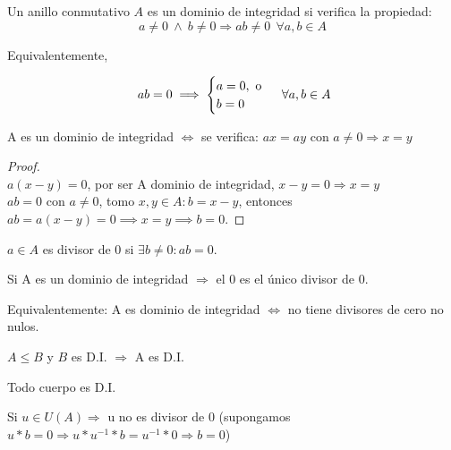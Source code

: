 \begin{ndef}
Un anillo conmutativo $A$ es un dominio de integridad si verifica la propiedad:
\[
a \neq 0\ \wedge\ b \neq 0 \Rightarrow ab \neq 0 \ \ \forall a,b \in A
\]

Equivalentemente,

\[ \hspace{0.1cm} ab=0 \implies \begin{cases}
	a = 0,\text{ o}\\
	b = 0
\end{cases} \ \forall a,b \in A
\]

\end{ndef}

\begin{nprop}

A es un dominio de integridad $\iff$ se verifica: $ax=ay$ con $a\neq 0 \Rightarrow x = y$
\end{nprop}
\begin{proof}\hfill\\
	\boxed{\Rightarrow} $a(x-y) = 0$, por ser A dominio de integridad, $x-y = 0 \Rightarrow x=y$ \\
	\boxed{\Leftarrow} $ab = 0$ con $a\neq 0$, tomo $x,y \in A : b = x-y$, entonces $ab = a(x-y) = 0 \implies x=y \implies b = 0$.
\end{proof}

\begin{ndef}[Divisor de 0]
	$a\in A$ es divisor de 0 si $\exists b\neq 0 : ab = 0$.
\end{ndef}

\begin{nprop}
	Si A es un dominio de integridad $\Rightarrow$ el 0 es el único divisor de 0.

	Equivalentemente: A es dominio de integridad $\iff$ no tiene divisores de cero no nulos.
\begin{nlist}
	\item $A\leq B$ y $B$ es D.I. $\Rightarrow$ A es D.I.
	\item Todo cuerpo es D.I.
	\item Si $u \in U(A) \Rightarrow$ u no es divisor de 0 (supongamos $u*b = 0 \Rightarrow u*u^{-1}*b = u^{-1}*0 \Rightarrow b=0$)
\end{nlist}
\end{nprop}

